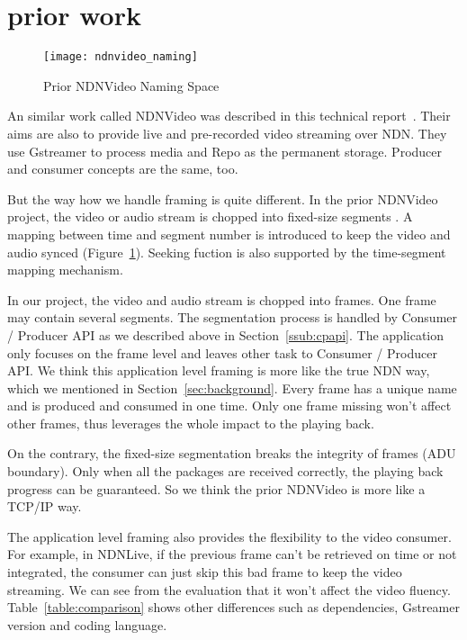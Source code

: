 \section{prior work} %
\label{sec:comparison}
\begin{figure}%
  \centering
  \texttt{[image: ndnvideo\_naming]}
  \vspace{-0.3cm}
  \caption{Prior NDNVideo Naming Space}
  \label{fig:ndnvideo_naming}
  \vspace{-0.2cm}
\end{figure}

An similar work called NDNVideo was described in this technical report~\cite{ndnvideo}. Their aims are also to provide live and pre-recorded video streaming over NDN. They use Gstreamer to process media and Repo as the permanent storage. Producer and consumer concepts are the same, too. 

But the way how we handle framing is quite different. In the prior NDNVideo project, the video or audio stream is chopped into fixed-size segments . A mapping between time and segment number is introduced to keep the video and audio synced (Figure~\ref{fig:ndnvideo_naming}). Seeking fuction is also supported by the time-segment mapping mechanism. 

In our project, the video and audio stream is chopped into frames. One frame may contain several segments. The segmentation process is handled by Consumer / Producer API as we described above in Section~\ref{ssub:cpapi}. The application only focuses on the frame level and leaves other task to Consumer / Producer API. We think this application level framing is more like the true NDN way, which we mentioned in Section~\ref{sec:background}. Every frame has a unique name and is produced and consumed in one time. Only one frame missing won't affect other frames, thus leverages the whole impact to the playing back.

On the contrary, the fixed-size segmentation breaks the integrity of frames (ADU boundary). Only when all the packages are received correctly, the playing back progress can be guaranteed. So we think the prior NDNVideo is more like a TCP/IP way. 

The application level framing also provides the flexibility to the video consumer. For example, in NDNLive, if the previous frame can't be retrieved on time or not integrated, the consumer can just skip this bad frame to keep the video streaming. We can see from the evaluation that it won't affect the video fluency. Table~\ref{table:comparison} shows other differences such as dependencies, Gstreamer version and coding language.

